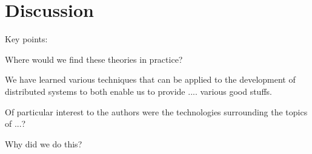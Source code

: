 \chapter{Discussion} \label{ch:discussion}

Key points:


Where would we find these theories in practice?

We have learned various techniques that can be applied to the development of distributed systems to both enable us to provide .... various good stuffs.

Of particular interest to the authors were the technologies surrounding the topics of ...?

Why did we do this?
